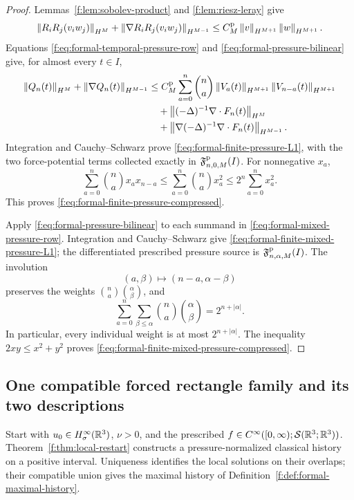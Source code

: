 \begin{proof}
Lemmas~\ref{f:lem:sobolev-product} and \ref{f:lem:riesz-leray} give
\begin{equation}
 \left\lVert R_iR_j(v_i w_j)\right\rVert_{H^M}
 +\left\lVert \nabla R_iR_j(v_i w_j)\right\rVert_{H^{M-1}}
 \le C_M^{\rm p}\left\lVert v\right\rVert_{H^{M+1}}\left\lVert w\right\rVert_{H^{M+1}}.
 \label{f:eq:formal-pressure-bilinear}
\end{equation}
Equations \eqref{f:eq:formal-temporal-pressure-row} and
\eqref{f:eq:formal-pressure-bilinear} give, for almost every \(t\in I\),
\begin{align*}
 \left\lVert Q_n(t)\right\rVert_{H^M}
 +\left\lVert \nabla Q_n(t)\right\rVert_{H^{M-1}}
 &\le
 C_M^{\rm p}\sum_{a=0}^{n}\binom na
 \left\lVert V_a(t)\right\rVert_{H^{M+1}}
 \left\lVert V_{n-a}(t)\right\rVert_{H^{M+1}}\\
 &\quad+\left\lVert (-\Delta)^{-1}\nabla\cdot F_n(t)\right\rVert_{H^M}\\
 &\quad+\left\lVert \nabla(-\Delta)^{-1}\nabla\cdot F_n(t)\right\rVert_{H^{M-1}}.
\end{align*}
Integration and Cauchy--Schwarz prove
\eqref{f:eq:formal-finite-pressure-L1}, with the two force-potential terms
collected exactly in \(\mathfrak F^{\rm p}_{n,0,M}(I)\).  For nonnegative \(x_a\),
\[
 \sum_{a=0}^{n}\binom nax_ax_{n-a}
 \le
 \sum_{a=0}^{n}\binom nax_a^2
 \le
 2^n\sum_{a=0}^{n}x_a^2.
\]
This proves \eqref{f:eq:formal-finite-pressure-compressed}.

Apply \eqref{f:eq:formal-pressure-bilinear} to each summand in
\eqref{f:eq:formal-mixed-pressure-row}.  Integration and Cauchy--Schwarz give
\eqref{f:eq:formal-finite-mixed-pressure-L1}; the differentiated prescribed
pressure source is \(\mathfrak F^{\rm p}_{n,\alpha,M}(I)\).  The involution
\[
 (a,\beta)\longmapsto(n-a,\alpha-\beta)
\]
preserves the weights
\(\binom na\binom{\alpha}{\beta}\), and
\[
 \sum_{a=0}^{n}\sum_{\beta\le\alpha}
 \binom na\binom{\alpha}{\beta}
 =2^{n+|\alpha|}.
\]
In particular, every individual weight is at most \(2^{n+|\alpha|}\).
The inequality \(2xy\le x^2+y^2\) proves
\eqref{f:eq:formal-finite-mixed-pressure-compressed}.
\end{proof}


\subsection{One compatible forced rectangle family and its two descriptions}
\label{f:sec:independent-intersection}

Start with \(u_0\in H^\infty_\sigma(\mathbb R^3)\), \(\nu>0\), and the prescribed
\(f\in C^\infty([0,\infty);\mathcal S(\mathbb R^3;\mathbb R^3))\).
Theorem~\ref{f:thm:local-restart} constructs a pressure-normalized classical
history on a positive interval. Uniqueness identifies the local solutions
on their overlaps; their compatible union gives the maximal history of
Definition~\ref{f:def:formal-maximal-history}.

